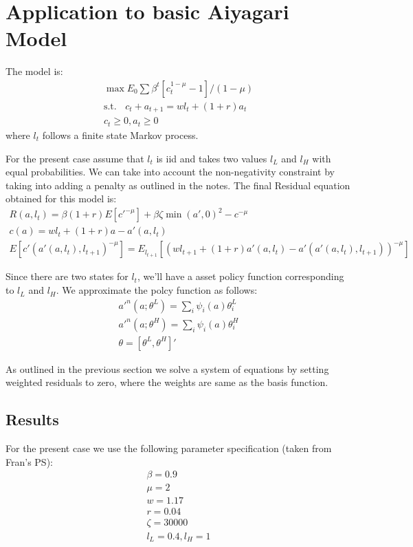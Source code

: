 \documentclass[12pt]{article}
\begin{document}
\newpage
\section{Application to basic Aiyagari Model}
The model is: 
\begin{gather*}
\max E_0 \sum \beta^t [c_t^{1-\mu} - 1]/(1-\mu) \\
\text{s.t. }\; \; c_t + a_{t+1} = w l_t + (1+r)a_t \\
c_t \geq 0, a_t \geq 0
\end{gather*}
where $l_t$ follows a finite state Markov process.

For the present case assume that $l_t$ is iid and takes two values $l_{L}$ and $l_{H}$ with equal probabilities. We can take into account the non-negativity constraint by taking into adding a penalty  as outlined in the notes. The final Residual equation obtained for this model is:
\begin{gather*}
R(a, l_t) = \beta(1+r) E[c'^{-\mu}] + \beta \zeta \min(a', 0)^2 - c^{-\mu}\\
c(a) = wl_t + (1+r)a - a'(a, l_t)\\
E[c'(a'(a, l_t), l_{t+1})^{-\mu}] = E_{l_{t+1}}[(wl_{t+1} +(1+r)a'(a, l_t) - a'(a'(a, l_t), l_{t+1}))^{-\mu}]
\end{gather*}

Since there are two states for $l_t$, we'll have a asset policy function corresponding to $l_L$ and $l_H$. We approximate the polcy function as follows:
\begin{gather*}
a'^n(a; \theta^L) = \sum_i \psi_i(a)\theta^L_i \\
a'^n(a; \theta^H) = \sum_i \psi_i(a)\theta^H_i \\
\theta = [\theta^L, \theta^H]'
\end{gather*}

As outlined in the previous section we solve a system of equations by setting weighted residuals to zero, where the weights are same as the basis function. 

\subsection{Results}
For the present case we use the following parameter specification (taken from Fran's PS):
\begin{align*}
\beta = 0.9 \\
\mu = 2 \\
w = 1.17 \\
r = 0.04 \\
\zeta = 30000 \\
l_L = 0.4, l_H = 1
\end{align*}
\end{document}
